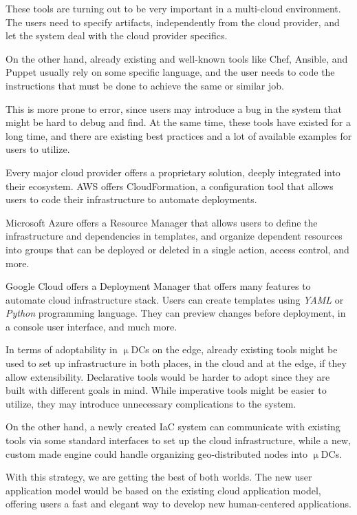 These tools are turning out to be very important in a multi-cloud environment. The users need to specify artifacts, independently from the cloud provider, and let the system deal with the cloud provider specifics.

On the other hand, already existing and well-known tools like Chef, Ansible, and Puppet usually rely on some specific language, and the user needs to code the instructions that must be done to achieve the same or similar job.

This is more prone to error, since users may introduce a bug in the system that might be hard to debug and find. At the same time, these tools have existed for a long time, and there are existing best practices and a lot of available examples for users to utilize.

Every major cloud provider offers a proprietary solution, deeply integrated into their ecosystem. AWS offers CloudFormation, a configuration tool that allows users to code their infrastructure to automate deployments.

Microsoft Azure offers a Resource Manager that allows users to define the infrastructure and dependencies in templates, and organize dependent resources into groups that can be deployed or deleted in a single action, access control, and more.

Google Cloud offers a Deployment Manager that offers many features to automate cloud infrastructure stack. Users can create templates using \emph{YAML} or \emph{Python} programming language. They can preview changes before deployment, in a console user interface, and much more.

In terms of adoptability in $\upmu$DCs on the edge, already existing tools might be used to set up infrastructure in both places, in the cloud and at the edge, if they allow extensibility. Declarative tools would be harder to adopt since they are built with different goals in mind. While imperative tools might be easier to utilize, they may introduce unnecessary complications to the system.

On the other hand, a newly created IaC system can communicate with existing tools via some standard interfaces to set up the cloud infrastructure, while a new, custom made engine could handle organizing geo-distributed nodes into $\upmu$DCs.

With this strategy, we are getting the best of both worlds. The new user application model would be based on the existing cloud application model, offering users a fast and elegant way to develop new human-centered applications.

